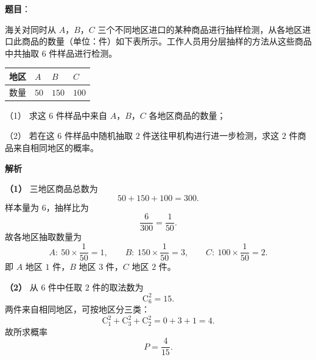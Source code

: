 \begin{answer}

\textbf{题目}：

海关对同时从 $A$，$B$，$C$ 三个不同地区进口的某种商品进行抽样检测，从各地区进口此商品的数量（单位：件）如下表所示。工作人员用分层抽样的方法从这些商品中共抽取 $6$ 件样品进行检测。

\begin{center}
\begin{tabular}{llll}
\toprule
地区 & $A$ & $B$ & $C$ \\
\midrule
数量 & $50$ & $150$ & $100$ \\
\bottomrule
\end{tabular}
\end{center}

（1） 求这 $6$ 件样品中来自 $A$，$B$，$C$ 各地区商品的数量；

（2） 若在这 $6$ 件样品中随机抽取 $2$ 件送往甲机构进行进一步检测，求这 $2$ 件商品来自相同地区的概率。

\textbf{解析}

\textbf{（1）} 三地区商品总数为
\nopagebreak[4]
\[50+150+100=300 .\]
样本量为 $6$，抽样比为
\nopagebreak[4]
\[\frac6{300}=\frac1{50}.\]
故各地区抽取数量为
\nopagebreak[4]
\[A:\ 50\times\frac1{50}=1,\qquad
B:\ 150\times\frac1{50}=3,\qquad
C:\ 100\times\frac1{50}=2 .\]
即 $A$ 地区 $1$ 件，$B$ 地区 $3$ 件，$C$ 地区 $2$ 件。

\textbf{（2）} 从 $6$ 件中任取 $2$ 件的取法数为
\nopagebreak[4]
\[\mathrm C_6^2=15 .\]
两件来自相同地区，可按地区分三类：
\nopagebreak[4]
\[\mathrm C_1^2+\mathrm C_3^2+\mathrm C_2^2=0+3+1=4 .\]
故所求概率
\nopagebreak[4]
\[P=\frac4{15}.\]



\end{answer}
